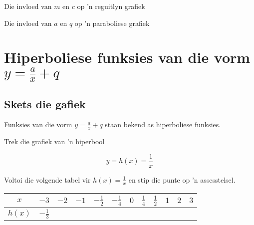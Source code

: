 \begin{Ondersoek}{Die invloed van $m$ en $c$ op 'n reguitlyn grafiek}
\begin{Ondersoek}{Die invloed van $a$ en $q$ op 'n paraboliese grafiek}
\begin{exercises}{}
{
}
\end{exercises}   

\section{Hiperboliese funksies van die vorm $y=\frac{a}{x}+q$}


\subsection*{Skets die gafiek}  
Funksies van die vorm $y=\frac{a}{x}+q$ staan bekend as hiperboliese funksies. 

\begin{wex}
{Trek die grafiek van 'n hiperbool}
{
\begin{equation*}
 y = h(x) = \frac{1}{x}
\end{equation*}

Voltoi die volgende tabel vir $h(x) = \frac{1}{x}$ en stip die punte op 'n assesstelsel.

\begin{table}[H]
\begin{center}
\begin{tabular}{|c|c|c|c|c|c|c|c|c|c|c|c|}
\hline
  $x$ &  $-3$ & $-2$ & $-1$ & $-\frac{1}{2}$ & $-\frac{1}{4}$ &$0$&$\frac{1}{4}$&$\frac{1}{2}$&$1$&$2$&$3$
\\ \hline
 $h(x)$& $-\frac{1}{3}$ &&&&&&&&&&
\\ \hline
\end{tabular}
\end{center}
\end{table}


}
\end{wex}
\end{Ondersoek}
\end{Ondersoek}
